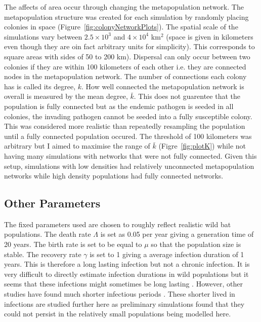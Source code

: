 The affects of area occur through changing the metapopulation network.
The metapopulation structure was created for each simulation by randomly placing colonies in space (Figure~\ref{fig:colonyNetworkPlots}).
The spatial scale of the simulations vary between \ensuremath{2.5\times 10^{3}} and \ensuremath{4\times 10^{4}} km$^2$ (space is given in kilometers even though they are oin fact arbitrary units for simplicity).
This corresponds to square areas with sides of 50 to 200 km).
Dispersal can only occur between two colonies if they are within 100 kilometers of each other i.e. they are connected nodes in the metapopulation network.
The number of connections each colony has is called its degree, $k$.
How well connected the metapopulation network is overall is measured by the mean degree, $\bar{k}$.
This does not guarentee that the population is fully connected but as the endemic pathogen is seeded in all colonies, the invading pathogen cannot be seeded into a fully susceptible colony.
This was considered more realistic than repeatedly resampling the population until a fully connected population occured.
The threshold of 100 kilometers was arbitrary but I aimed to maximise the range  of $\bar{k}$ (Figre~\ref{fig:plotK}) while not having many simulations with networks that were not fully connected.
Given this setup, simulations with low densities had relatively unconnected metapopulation networks while high density populations had fully connected networks.



\subsection{Other Parameters}

The fixed parameters used are chosen to roughly reflect realistic wild bat populations. 
The death rate $\Lambda$ is set as 0.05 per year giving a generation time of 20 years.
The birth rate is set to be equal to $\mu$ so that the population size is stable.
The recovery rate $\gamma$ is set to 1 giving a average infection duration of 1 years. 
This is therefore a long lasting infection but not a chronic infection. 
It is very difficult to directly estimate infection durations in wild populations but it seems that these infections might sometimes be long lasting \cite{peel2012henipavirus, plowright2015ecological}.
However, other studies have found much shorter infectious periods \cite{amengual2007temporal}.
These shorter lived in infections are studied further here as preliminary simulations found that they could not persist in the relatively small populations being modelled here.

